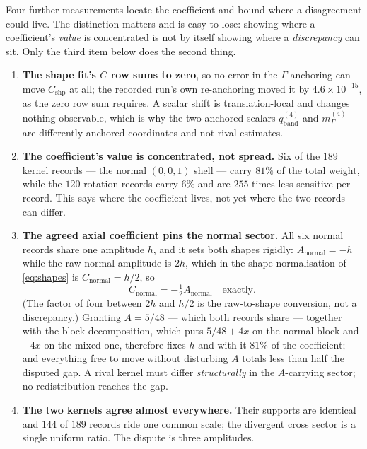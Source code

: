 \documentclass[11pt]{article}
\theoremstyle{plain}
\theoremstyle{definition}
\theoremstyle{remark}
\newcommand{\chk}[1]{}
\begin{document}
Four further measurements locate the coefficient and bound where a
disagreement could live. The distinction matters and is easy to lose: showing
where a coefficient's \emph{value} is concentrated is not by itself showing
where a \emph{discrepancy} can sit. Only the third item below does the second
thing.

\begin{enumerate}\itemsep2pt
\item \textbf{The shape fit's $C$ row sums to zero}, so no error in the
  $\Gamma$ anchoring can move $C_{\mathrm{shp}}$ at all; the recorded run's own
  re-anchoring moved it by $4.6\times10^{-15}$, as the zero row sum requires.
  A scalar shift is translation-local and changes nothing observable, which is
  why the two anchored scalars $q_{\mathrm{band}}^{(4)}$ and
  $m_\Gamma^{(4)}$ are differently anchored coordinates and not rival
  estimates.
\item \textbf{The coefficient's value is concentrated, not spread.} Six of
  the $189$ kernel records --- the normal $(0,0,1)$ shell --- carry $81\%$ of
  the total weight, while the $120$ rotation records carry $6\%$ and are $255$
  times less sensitive per record. This says where the coefficient lives, not
  yet where the two records can differ.
\item \textbf{The agreed axial coefficient pins the normal sector.} All six
  normal records share one amplitude $h$, and it sets both shapes rigidly:
  $A_{\mathrm{normal}}=-h$ while the raw normal amplitude is $2h$, which in the
  shape normalisation of \eqref{eq:shapes} is $C_{\mathrm{normal}}=h/2$, so
  \[
    C_{\mathrm{normal}}=-\tfrac12 A_{\mathrm{normal}}\quad\text{exactly.}
  \]
  (The factor of four between $2h$ and $h/2$ is the raw-to-shape conversion,
  not a discrepancy.) Granting $A=5/48$ --- which both records share --- together
  with the block decomposition, which puts $5/48+4x$ on the normal block and
  $-4x$ on the mixed one, therefore fixes $h$ and with it $81\%$ of the
  coefficient; and everything free to move without disturbing $A$ totals less
  than half the disputed gap. A rival kernel must differ \emph{structurally} in
  the $A$-carrying sector; no redistribution reaches the gap.
\item \textbf{The two kernels agree almost everywhere.} Their supports are
  identical and $144$ of $189$ records ride one common scale; the divergent
  cross sector is a single uniform ratio. The dispute is three amplitudes.
\end{enumerate}
\chk{the shape fit's C row sums to zero, so no Gamma-anchor error can move C\_shp at all}
\chk{a translation-local scalar shift changes nothing observable}
\chk{FINDING: C\_shp is carried by 6 of 189 records, not spread across the kernel}
\chk{FINDING: A = 5/48 pins the normal sector's whole C4 contribution}
\chk{C\_normal = -A\_normal/2: the agreed axial coefficient pins the normal channel}
\chk{the two 189-record kernels agree everywhere except three amplitudes, and the on-site anchor swap moves C by exactly zero}
\end{document}
